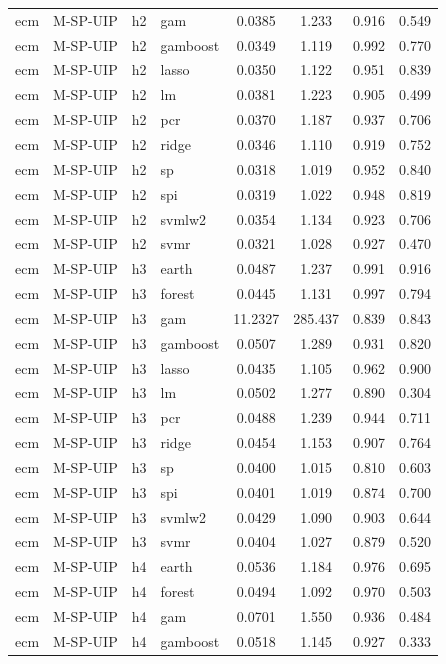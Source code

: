 \begin{ThreePartTable}
\begin{longtable}[t]{llclcccc}
ecm & M-SP-UIP & h2 & gam & 0.0385 & 1.233 & 0.916 & 0.549\\
ecm & M-SP-UIP & h2 & gamboost & 0.0349 & 1.119 & 0.992 & 0.770\\
ecm & M-SP-UIP & h2 & lasso & 0.0350 & 1.122 & 0.951 & 0.839\\
ecm & M-SP-UIP & h2 & lm & 0.0381 & 1.223 & 0.905 & 0.499\\
ecm & M-SP-UIP & h2 & pcr & 0.0370 & 1.187 & 0.937 & 0.706\\
ecm & M-SP-UIP & h2 & ridge & 0.0346 & 1.110 & 0.919 & 0.752\\
ecm & M-SP-UIP & h2 & sp & 0.0318 & 1.019 & 0.952 & 0.840\\
ecm & M-SP-UIP & h2 & spi & 0.0319 & 1.022 & 0.948 & 0.819\\
ecm & M-SP-UIP & h2 & svmlw2 & 0.0354 & 1.134 & 0.923 & 0.706\\
ecm & M-SP-UIP & h2 & svmr & 0.0321 & 1.028 & 0.927 & 0.470\\
\addlinespace
ecm & M-SP-UIP & h3 & earth & 0.0487 & 1.237 & 0.991 & 0.916\\
ecm & M-SP-UIP & h3 & forest & 0.0445 & 1.131 & 0.997 & 0.794\\
ecm & M-SP-UIP & h3 & gam & 11.2327 & 285.437 & 0.839 & 0.843\\
ecm & M-SP-UIP & h3 & gamboost & 0.0507 & 1.289 & 0.931 & 0.820\\
ecm & M-SP-UIP & h3 & lasso & 0.0435 & 1.105 & 0.962 & 0.900\\
ecm & M-SP-UIP & h3 & lm & 0.0502 & 1.277 & 0.890 & 0.304\\
ecm & M-SP-UIP & h3 & pcr & 0.0488 & 1.239 & 0.944 & 0.711\\
ecm & M-SP-UIP & h3 & ridge & 0.0454 & 1.153 & 0.907 & 0.764\\
ecm & M-SP-UIP & h3 & sp & 0.0400 & 1.015 & 0.810 & 0.603\\
ecm & M-SP-UIP & h3 & spi & 0.0401 & 1.019 & 0.874 & 0.700\\
ecm & M-SP-UIP & h3 & svmlw2 & 0.0429 & 1.090 & 0.903 & 0.644\\
ecm & M-SP-UIP & h3 & svmr & 0.0404 & 1.027 & 0.879 & 0.520\\
\addlinespace
ecm & M-SP-UIP & h4 & earth & 0.0536 & 1.184 & 0.976 & 0.695\\
ecm & M-SP-UIP & h4 & forest & 0.0494 & 1.092 & 0.970 & 0.503\\
ecm & M-SP-UIP & h4 & gam & 0.0701 & 1.550 & 0.936 & 0.484\\
ecm & M-SP-UIP & h4 & gamboost & 0.0518 & 1.145 & 0.927 & 0.333\\

\end{longtable}
\end{ThreePartTable}

